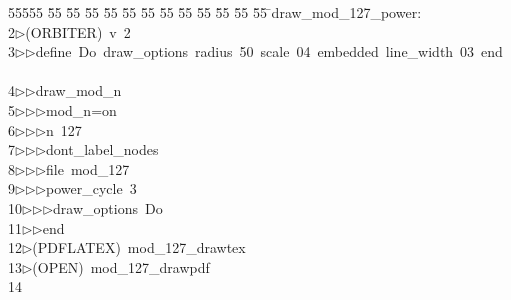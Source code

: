 %
%
\begin{tabbing}
55555 \= 55 \= 55 \= 55 \= 55 \= 55 \= 55 \= 55 \= 55 \= 55 \= 55 \= 55 \= 55 \= \>draw\_mod\_127\_power:\\[0pt]
2\>$\triangleright$\>(ORBITER)\ v\ 2\ \\[0pt]
3\>$\triangleright$\>$\triangleright$\>define\ Do\ draw\_options\ radius\ 50\ scale\ 04\ embedded\ line\_width\ 03\ end\\[0pt]
\>\ \\[0pt]
4\>$\triangleright$\>$\triangleright$\>draw\_mod\_n\ \\[0pt]
5\>$\triangleright$\>$\triangleright$\>$\triangleright$\>mod\_n=on\ \\[0pt]
6\>$\triangleright$\>$\triangleright$\>$\triangleright$\>n\ 127\ \\[0pt]
7\>$\triangleright$\>$\triangleright$\>$\triangleright$\>dont\_label\_nodes\ \\[0pt]
8\>$\triangleright$\>$\triangleright$\>$\triangleright$\>file\ mod\_127\ \\[0pt]
9\>$\triangleright$\>$\triangleright$\>$\triangleright$\>power\_cycle\ 3\ \\[0pt]
10\>$\triangleright$\>$\triangleright$\>$\triangleright$\>draw\_options\ Do\ \\[0pt]
11\>$\triangleright$\>$\triangleright$\>end\\[0pt]
12\>$\triangleright$\>(PDFLATEX)\ mod\_127\_drawtex\\[0pt]
13\>$\triangleright$\>(OPEN)\ mod\_127\_drawpdf\\[0pt]
14\>\end{tabbing}
